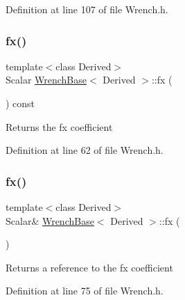 Definition at line 107 of file Wrench.\+h.

\hypertarget{class_wrench_base_ab4883d6553bab8cbe99737b664cbbd31}{}\label{class_wrench_base_ab4883d6553bab8cbe99737b664cbbd31} 
\subsubsection{\texorpdfstring{fx()}{fx()}\hspace{0.1cm}{\footnotesize\ttfamily [1/2]}}
{\footnotesize\ttfamily template$<$class Derived$>$ \\
Scalar \hyperlink{class_wrench_base}{Wrench\+Base}$<$ Derived $>$\+::fx (\begin{DoxyParamCaption}{ }\end{DoxyParamCaption}) const\hspace{0.3cm}{\ttfamily [inline]}}

\begin{DoxyReturn}{Returns}
the {\ttfamily fx} coefficient 
\end{DoxyReturn}


Definition at line 62 of file Wrench.\+h.

\hypertarget{class_wrench_base_a3d177354f7fd128d20f8086b7e071116}{}\label{class_wrench_base_a3d177354f7fd128d20f8086b7e071116} 
\subsubsection{\texorpdfstring{fx()}{fx()}\hspace{0.1cm}{\footnotesize\ttfamily [2/2]}}
{\footnotesize\ttfamily template$<$class Derived$>$ \\
Scalar\& \hyperlink{class_wrench_base}{Wrench\+Base}$<$ Derived $>$\+::fx (\begin{DoxyParamCaption}{ }\end{DoxyParamCaption})\hspace{0.3cm}{\ttfamily [inline]}}

\begin{DoxyReturn}{Returns}
a reference to the {\ttfamily fx} coefficient 
\end{DoxyReturn}


Definition at line 75 of file Wrench.\+h.

\hypertarget{class_wrench_base_a9cf08f34e7d12b9fda2cd521fbca527e}{}\label{class_wrench_base_a9cf08f34e7d12b9fda2cd521fbca527e} 
